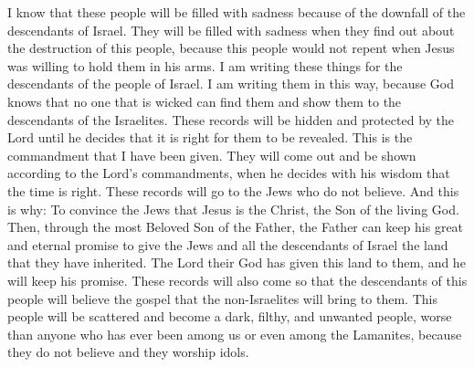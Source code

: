 I know that these people will be filled with sadness because of the downfall of the descendants of Israel. They will be filled with sadness when they find out about the destruction of this people, because this people would not repent when Jesus was willing to hold them in his arms.
\bverse \iffalse Now these things are written unto the remnant of the house of Jacob; and they are written after this manner, because it is known of God that wickedness will not bring them forth unto them; and they are to be hid up unto the Lord that they may come forth in his own due time. \fi
I am writing these things for the descendants of the people of Israel. I am writing them in this way, because God knows that no one that is wicked can find them and show them to the descendants of the Israelites. These records will be hidden and protected by the Lord until he decides that it is right for them to be revealed.
\bverse \iffalse And this is the commandment which I have received; and behold, they shall come forth according to the commandment of the Lord, when he shall see fit, in his wisdom. \fi
This is the commandment that I have been given. They will come out and be shown according to the Lord's commandments, when he decides with his wisdom that the time is right.
\bverse \iffalse And behold, they shall go unto the unbelieving of the Jews; and for this intent shall they go--that they may be persuaded that Jesus is the Christ, the Son of the living God; that the Father may bring about, through his most Beloved, his great and eternal purpose, in restoring the Jews, or all the house of Israel, to the land of their inheritance, which the Lord their God hath given them, unto the fulfilling of his covenant; \fi
These records will go to the Jews who do not believe. And this is why: To convince the Jews that Jesus is the Christ, the Son of the living God. Then, through the most Beloved Son of the Father, the Father can keep his great and eternal promise to give the Jews and all the descendants of Israel the land that they have inherited. The Lord their God has given this land to them, and he will keep his promise.
\bverse \iffalse And also that the seed of this people may more fully believe his gospel, which shall go forth unto them from the Gentiles; for this people shall be scattered, and shall become a dark, a filthy, and a loathsome people, beyond the description of that which ever hath been amongst us, yea, even that which hath been among the Lamanites, and this because of their unbelief and idolatry. \fi
These records will also come so that the descendants of this people will believe the gospel that the non-Israelites will bring to them. This people will be scattered and become a dark, filthy, and unwanted people, worse than anyone who has ever been among us or even among the Lamanites, because they do not believe and they worship idols.

